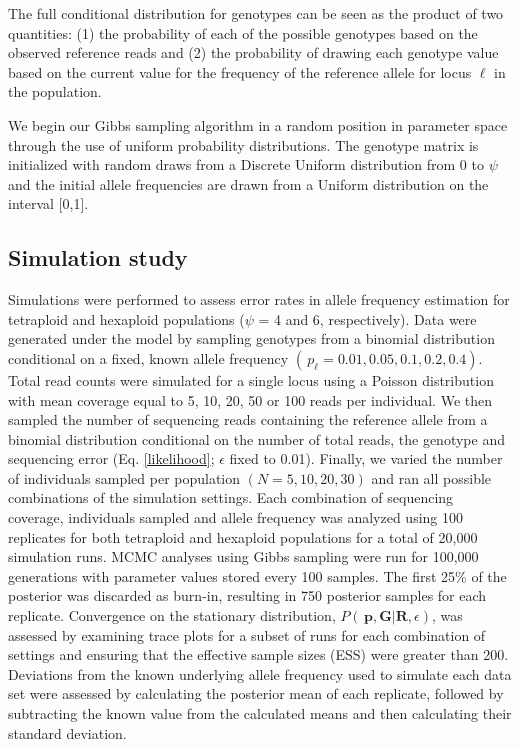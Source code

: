 \documentclass[11pt,english,letterpaper,oneside]{article}
\begin{document}
\noindent The full conditional distribution for genotypes can be seen as the product of two quantities: (1) the probability of each of the possible genotypes based on the observed  reference reads and (2) the probability of drawing each genotype value based on the current value for the frequency of the reference allele for locus $\ell$ in the population. 

We begin our Gibbs sampling algorithm in a random position in parameter space through the use of uniform probability distributions. The genotype matrix is initialized with random draws from a Discrete Uniform distribution from $0$ to $\psi$ and the initial allele frequencies are drawn from a Uniform distribution on the interval [0,1]. 

\medskip
\subsection*{Simulation study}
\medskip

Simulations were performed to assess error rates in allele frequency estimation for tetraploid and hexaploid populations ($\psi$ = 4 and 6, respectively). Data were generated under the model by sampling genotypes from a binomial distribution conditional on a fixed, known allele frequency $(\,p_{\ell} = 0.01, 0.05, 0.1, 0.2, 0.4)$. Total read counts were simulated for a single locus using a Poisson distribution with mean coverage equal to 5, 10, 20, 50 or 100 reads per individual. We then sampled the number of sequencing reads containing the reference allele from a binomial distribution conditional on the number of total reads, the genotype and sequencing error (Eq. \ref{likelihood}; $\epsilon$ fixed to 0.01). Finally, we varied the number of individuals sampled per population $(N = 5, 10, 20, 30)$ and ran all possible combinations of the simulation settings. Each combination of sequencing coverage, individuals sampled and allele frequency was analyzed using 100 replicates for both tetraploid and hexaploid populations for a total of  20,000 simulation runs. MCMC analyses using Gibbs sampling were run for 100,000 generations with parameter values stored every 100 samples. The first 25\% of the posterior was discarded as burn-in, resulting in 750 posterior samples for each replicate. Convergence on the stationary distribution, $P(\,\bm{p},\bm{G}|\bm{R},\epsilon)$, was assessed by examining trace plots for a subset of runs for each combination of settings and ensuring that the effective sample sizes (ESS) were greater than 200. Deviations from the known underlying allele frequency used to simulate each data set were assessed by calculating the posterior mean of each replicate, followed by subtracting the known value from the calculated means and then calculating their standard deviation.
\medskip
\end{document}

